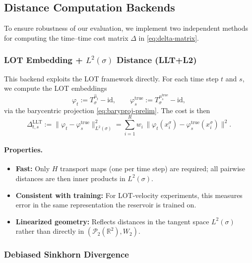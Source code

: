 \documentclass[11pt]{article}
\newcommand{\chg}[1]{{\color{red}#1}}
\newcommand{\1}{\mathbf{1}}
\begin{document}
\subsection{Distance Computation Backends}\label{sec:metric-backends}

To ensure robustness of our evaluation, we implement two independent methods for computing the time–time cost matrix $\Delta$ in \eqref{eq:delta-matrix}.

\subsubsection{LOT Embedding + $L^2(\sigma)$ Distance (LLT+L2)}

This backend exploits the LOT framework directly. For each time step $t$ and $s$, we compute the LOT embeddings
\begin{equation}
\varphi_t := T_\sigma^{\widehat{\mu}_t} - \mathrm{id}, 
\qquad 
\varphi_s^{\text{true}} := T_\sigma^{\mu_s^{\text{true}}} - \mathrm{id},
\end{equation}
via the barycentric projection \chg{\eqref{eq:baryproj-prelim}}. The cost is then
\begin{equation}\label{eq:delta-llt-l2}
\Delta_{t,s}^{\mathrm{LLT}} 
:= \|\varphi_t - \varphi_s^{\text{true}}\|_{L^2(\sigma)}^2 
= \sum_{i=1}^R w_i \,\big\|\varphi_t(x_i^\sigma) - \varphi_s^{\text{true}}(x_i^\sigma)\big\|^2.
\end{equation}

\paragraph{Properties.}
\begin{itemize}
\item \textbf{Fast:} Only $H$ transport maps (one per time step) are required; all pairwise distances are then inner products in $L^2(\sigma)$.
\item \textbf{Consistent with training:} For LOT-velocity experiments, this measures error in the same representation the reservoir is trained on.
\item \textbf{Linearized geometry:} Reflects distances in the tangent space $L^2(\sigma)$ rather than directly in $(\mathcal{P}_2(\mathbb{R}^2), W_2)$.
\end{itemize}

\subsubsection{Debiased Sinkhorn Divergence}
\end{document}
